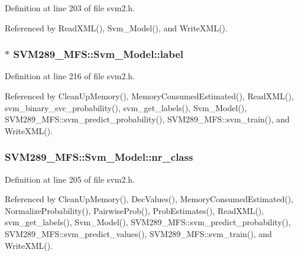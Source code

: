 Definition at line 203 of file svm2.\+h.



Referenced by Read\+X\+M\+L(), Svm\+\_\+\+Model(), and Write\+X\+M\+L().

\subsubsection[{\texorpdfstring{label}{label}}]{$\ast$ S\+V\+M289\+\_\+\+M\+F\+S\+::\+Svm\+\_\+\+Model\+::label}\hypertarget{struct_s_v_m289___m_f_s_1_1_svm___model_a2f46b2e4f808a25c5f4d15e65c988872}{}\label{struct_s_v_m289___m_f_s_1_1_svm___model_a2f46b2e4f808a25c5f4d15e65c988872}


Definition at line 216 of file svm2.\+h.



Referenced by Clean\+Up\+Memory(), Memory\+Consumed\+Estimated(), Read\+X\+M\+L(), svm\+\_\+binary\+\_\+svc\+\_\+probability(), svm\+\_\+get\+\_\+labels(), Svm\+\_\+\+Model(), S\+V\+M289\+\_\+\+M\+F\+S\+::svm\+\_\+predict\+\_\+probability(), S\+V\+M289\+\_\+\+M\+F\+S\+::svm\+\_\+train(), and Write\+X\+M\+L().

\subsubsection[{\texorpdfstring{nr\+\_\+class}{nr_class}}]{ S\+V\+M289\+\_\+\+M\+F\+S\+::\+Svm\+\_\+\+Model\+::nr\+\_\+class}\hypertarget{struct_s_v_m289___m_f_s_1_1_svm___model_a0cf11115996187369bc6152f30f6e64c}{}\label{struct_s_v_m289___m_f_s_1_1_svm___model_a0cf11115996187369bc6152f30f6e64c}


Definition at line 205 of file svm2.\+h.



Referenced by Clean\+Up\+Memory(), Dec\+Values(), Memory\+Consumed\+Estimated(), Normalize\+Probability(), Pairwise\+Prob(), Prob\+Estimates(), Read\+X\+M\+L(), svm\+\_\+get\+\_\+labels(), Svm\+\_\+\+Model(), S\+V\+M289\+\_\+\+M\+F\+S\+::svm\+\_\+predict\+\_\+probability(), S\+V\+M289\+\_\+\+M\+F\+S\+::svm\+\_\+predict\+\_\+values(), S\+V\+M289\+\_\+\+M\+F\+S\+::svm\+\_\+train(), and Write\+X\+M\+L().

